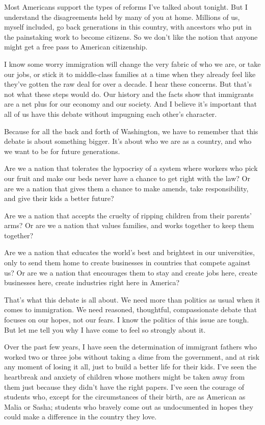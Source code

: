 \documentclass[10pt,a4paper]{article}
\begin{document}
Most Americans support the types of reforms I’ve talked about tonight. But I understand the disagreements held by many of you at home. Millions of us, myself included, go back generations in this country, with ancestors who put in the painstaking work to become citizens. So we don’t like the notion that anyone might get a free pass to American citizenship.

I know some worry immigration will change the very fabric of who we are, or take our jobs, or stick it to middle-class families at a time when they already feel like they’ve gotten the raw deal for over a decade. I hear these concerns. But that’s not what these steps would do. Our history and the facts show that immigrants are a net plus for our economy and our society. And I believe it’s important that all of us have this debate without impugning each other’s character.

Because for all the back and forth of Washington, we have to remember that this debate is about something bigger. It’s about who we are as a country, and who we want to be for future generations.

Are we a nation that tolerates the hypocrisy of a system where workers who pick our fruit and make our beds never have a chance to get right with the law? Or are we a nation that gives them a chance to make amends, take responsibility, and give their kids a better future?

Are we a nation that accepts the cruelty of ripping children from their parents’ arms? Or are we a nation that values families, and works together to keep them together?

Are we a nation that educates the world’s best and brightest in our universities, only to send them home to create businesses in countries that compete against us? Or are we a nation that encourages them to stay and create jobs here, create businesses here, create industries right here in America?

That’s what this debate is all about. We need more than politics as usual when it comes to immigration. We need reasoned, thoughtful, compassionate debate that focuses on our hopes, not our fears. I know the politics of this issue are tough. But let me tell you why I have come to feel so strongly about it.

Over the past few years, I have seen the determination of immigrant fathers who worked two or three jobs without taking a dime from the government, and at risk any moment of losing it all, just to build a better life for their kids. I’ve seen the heartbreak and anxiety of children whose mothers might be taken away from them just because they didn’t have the right papers. I’ve seen the courage of students who, except for the circumstances of their birth, are as American as Malia or Sasha; students who bravely come out as undocumented in hopes they could make a difference in the country they love.
\end{document}
